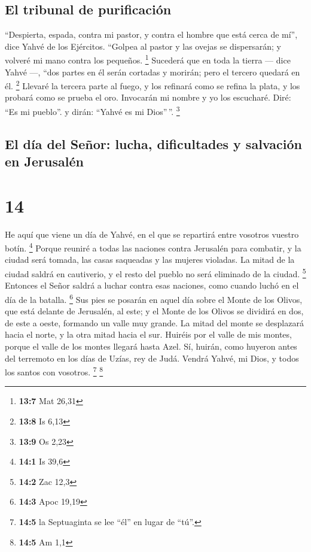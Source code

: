 \hypertarget{el-tribunal-de-purificaciuxf3n}{%
\subsection{El tribunal de
purificación}\label{el-tribunal-de-purificaciuxf3n}}

 ``Despierta, espada, contra mi pastor, y contra el hombre
que está cerca de mí'', dice Yahvé de los Ejércitos. ``Golpea al pastor
y las ovejas se dispersarán; y volveré mi mano contra los pequeños.
\footnote{\textbf{13:7} Mat 26,31}  Sucederá que en toda
la tierra --- dice Yahvé ---, ``dos partes en él serán cortadas y
morirán; pero el tercero quedará en él. \footnote{\textbf{13:8} Is 6,13}
 Llevaré la tercera parte al fuego, y los refinará como se
refina la plata, y los probará como se prueba el oro. Invocarán mi
nombre y yo los escucharé. Diré: ``Es mi pueblo''. y dirán: ``Yahvé es
mi Dios''\,''. \footnote{\textbf{13:9} Os 2,23}

\hypertarget{el-duxeda-del-seuxf1or-lucha-dificultades-y-salvaciuxf3n-en-jerusaluxe9n}{%
\subsection{El día del Señor: lucha, dificultades y salvación en
Jerusalén}\label{el-duxeda-del-seuxf1or-lucha-dificultades-y-salvaciuxf3n-en-jerusaluxe9n}}

\hypertarget{section-13}{%
\section{14}\label{section-13}}

 He aquí que viene un día de Yahvé, en el que se repartirá
entre vosotros vuestro botín. \footnote{\textbf{14:1} Is 39,6}
 Porque reuniré a todas las naciones contra Jerusalén para
combatir, y la ciudad será tomada, las casas saqueadas y las mujeres
violadas. La mitad de la ciudad saldrá en cautiverio, y el resto del
pueblo no será eliminado de la ciudad. \footnote{\textbf{14:2} Zac 12,3}
 Entonces el Señor saldrá a luchar contra esas naciones,
como cuando luchó en el día de la batalla. \footnote{\textbf{14:3} Apoc
  19,19}  Sus pies se posarán en aquel día sobre el Monte
de los Olivos, que está delante de Jerusalén, al este; y el Monte de los
Olivos se dividirá en dos, de este a oeste, formando un valle muy
grande. La mitad del monte se desplazará hacia el norte, y la otra mitad
hacia el sur.  Huiréis por el valle de mis montes, porque
el valle de los montes llegará hasta Azel. Sí, huirán, como huyeron
antes del terremoto en los días de Uzías, rey de Judá. Vendrá Yahvé, mi
Dios, y todos los santos con vosotros. \footnote{\textbf{14:5} la
  Septuaginta se lee ``él'' en lugar de ``tú''.} \footnote{\textbf{14:5}
  Am 1,1}

